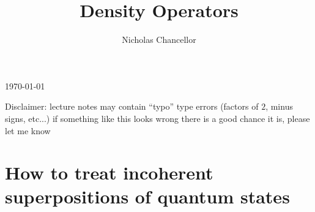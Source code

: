 \documentclass[english]{article}
\begin{document}
\title{Density Operators}
\author{Nicholas Chancellor}


\maketitle


\today %


{\small Disclaimer: lecture notes may contain ``typo'' type errors (factors of $2$, minus signs, etc...) if something like this looks wrong there is a good chance it is, please let me know}


\section{How to treat incoherent superpositions of quantum states}
\end{document}
